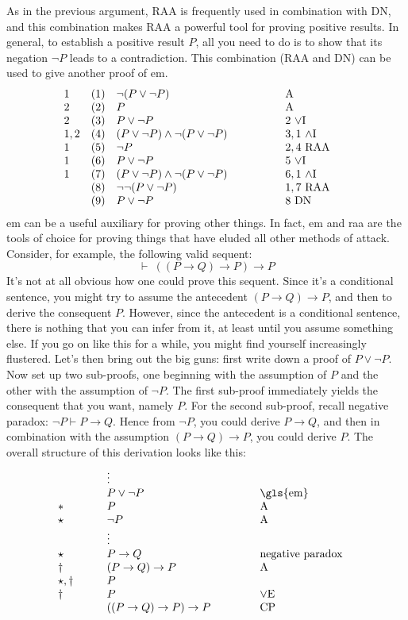 As in the previous argument, RAA is frequently used in combination
with DN, and this combination makes RAA a powerful tool for proving
positive results.  In general, to establish a positive result $P$, all
you need to do is to show that its negation $\neg P$ leads to a
contradiction.  This combination (RAA and DN) can be used to give
another proof of \gls{em}. 
\[ \begin{array}{l l >{$}p{5cm}<{$} p{2cm} l l}
     1 & (1) & \neg (P\vee \neg P) & A \\
     2 & (2) & P & A \\
     2 & (3) & P\vee \neg P & $2$ $\vee$I \\
     1,2 & (4) & (P\vee \neg P)\wedge \neg (P\vee \neg P) & $3,1$ $\wedge$I  \\
     1 & (5) & \neg P & $2,4$ RAA \\
     1 & (6) & P\vee \neg P & $5$ $\vee$I \\
     1 & (7) & (P\vee \neg P)\wedge \neg (P\vee \neg P) & $6,1$ $\wedge$I \\
       & (8) & \neg \neg (P\vee \neg P) & $1,7$ RAA \\
       & (9) & P\vee \neg P &
                              $8$ DN \end{array} \] \gls{em} can be a
 useful auxiliary for proving other things.  In fact, \gls{em} and \gls{raa} are the tools of choice for proving things that have eluded all other methods of attack.  Consider, for example, the following valid sequent:
 \[ \vdash\:((P\to Q)\to P)\to P \] It's not at all obvious how one
 could prove this sequent.  Since it's a conditional sentence, you
 might try to assume the antecedent $(P\to Q)\to P$, and then to
 derive the consequent $P$.  However, since the antecedent is a
 conditional sentence, there is nothing that you can infer from it, at
 least until you assume something else.  If you go on like this for a
 while, you might find yourself increasingly flustered.  Let's then
 bring out the big guns: first write down a proof of $P\vee \neg P$.
 Now set up two sub-proofs, one beginning with the assumption of $P$
 and the other with the assumption of $\neg P$.  The first sub-proof
 immediately yields the consequent that you want, namely $P$.  For the
 second sub-proof, recall negative paradox: $\neg P\vdash P\to Q$.
 Hence from $\neg P$, you could derive $P\to Q$, and then in
 combination with the assumption $(P\to Q)\to P$, you could derive
 $P$.  The overall structure of this derivation looks like this:
\[ \begin{array}{>{$}p{1.2cm}<{$} >{$}p{4.5cm}<{$} p{3cm}}
     & \vdots  \\
     & P\vee \neg P & \gls{em} \\
     \ast  & P            & A \\
     \star & \neg P       & A \\
     & \vdots       &   \\
     \star   & P\to Q       & negative paradox \\
     \dagger  & (P\to Q)\to P & A \\
     \star ,\dagger   & P   \\
     \dagger   & P     & $\vee$E \\
     & ((P\to Q)\to P)\to P & CP \end{array} \] %

